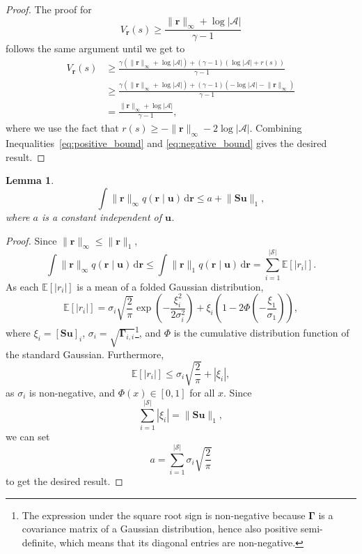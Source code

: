 \documentclass{mpaper}
\newtheorem{lemma}[theorem]{Lemma}
\newcommand{\V}{V_{\mathbf{r}}}
\newcommand{\rinf}{\lVert \mathbf{r} \rVert_\infty}
\begin{document}
\begin{proof}
  The proof for
  \begin{equation} \label{eq:negative_bound}
    \V(s) \ge \frac{\rinf + \log|\mathcal{A}|}{\gamma - 1}
  \end{equation}
  follows the same argument until we get to
  \begin{align*}
    \V(s) &\ge \frac{\gamma(\rinf + \log|\mathcal{A}|) + (\gamma - 1)(\log|\mathcal{A}| + r(s))}{\gamma - 1} \\
          &\ge \frac{\gamma(\rinf + \log|\mathcal{A}|) + (\gamma - 1)(-\log|\mathcal{A}| -\rinf)}{\gamma - 1} \\
          &= \frac{\rinf + \log|\mathcal{A}|}{\gamma - 1},
  \end{align*}
  where we use the fact that $r(s) \ge -\rinf - 2\log|\mathcal{A}|$. Combining
  Inequalities~\eqref{eq:positive_bound} and \eqref{eq:negative_bound} gives
  the desired result.
\end{proof}

\begin{lemma} \label{lemma:integral_of_r}
  \[
    \int \lVert \mathbf{r} \rVert_\infty q(\mathbf{r} \mid
    \mathbf{u})\,\mathrm{d}\mathbf{r} \le a + \lVert \mathbf{Su} \rVert_1,
  \]
  where $a$ is a constant independent of $\mathbf{u}$.
\end{lemma}
\begin{proof}
  Since $\rinf \le \lVert \mathbf{r} \rVert_1$,
  \[
    \int \lVert \mathbf{r} \rVert_\infty q(\mathbf{r} \mid
    \mathbf{u})\,\mathrm{d}\mathbf{r} \le \int \lVert \mathbf{r} \rVert_1
    q(\mathbf{r} \mid \mathbf{u})\,\mathrm{d}\mathbf{r} =
    \sum_{i=1}^{|\mathcal{S}|} \mathbb{E}[|r_i|].
  \]
  As each $\mathbb{E}[|r_i|]$ is a mean of a folded Gaussian distribution,
  \[
    \mathbb{E}[|r_i|] = \sigma_i \sqrt{\frac{2}{\pi}} \exp
    \left(-\frac{\xi_i^2}{2\sigma_i^2} \right) + \xi_i \left( 1 - 2\Phi \left(
        -\frac{\xi_1}{\sigma_1} \right) \right),
  \]
  where $\xi_i = \left[\mathbf{Su}\right]_i$, $\sigma_i =
  \sqrt{\bm\Gamma_{i,i}}$\footnote{The expression
    under the square root sign is non-negative because $\bm\Gamma$ is a
    covariance matrix of a Gaussian distribution, hence also positive
    semi-definite, which means that its diagonal entries are non-negative.}, and
  $\Phi$ is the cumulative distribution function of the standard Gaussian.
  Furthermore,
  \[
    \mathbb{E}[|r_i|] \le \sigma_i\sqrt{\frac{2}{\pi}} + |\xi_i|,
  \]
  as $\sigma_i$ is non-negative, and $\Phi(x) \in [0, 1]$ for all $x$. Since
  \[
    \sum_{i=1}^{|\mathcal{S}|} |\xi_i| = \lVert \mathbf{Su} \rVert_1,
  \]
  we can set
  \[ a = \sum_{i=1}^{|\mathcal{S}|} \sigma_i \sqrt{\frac{2}{\pi}} \]
  to get the desired result.
\end{proof}
\end{document}
